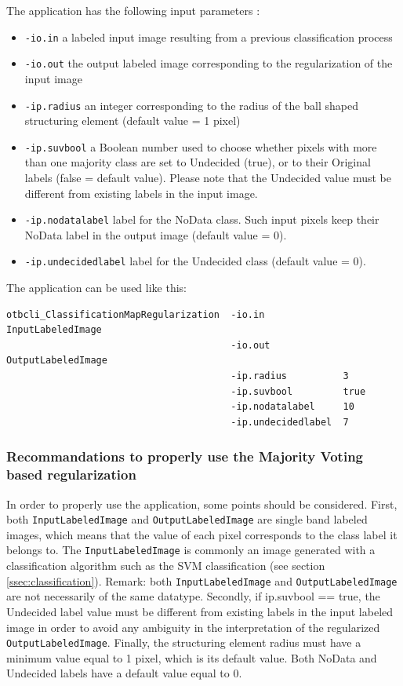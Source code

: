 The  application has the following input parameters :
\begin{itemize}
\item \verb?-io.in? a labeled input image resulting from a previous classification process
\item \verb?-io.out? the output labeled image corresponding to the regularization of the input image
\item \verb?-ip.radius? an integer corresponding to the radius of the ball shaped structuring element (default value = 1 pixel)
\item \verb?-ip.suvbool? a Boolean number used to choose whether pixels with more than one majority class are set to Undecided (true),
or to their Original labels (false = default value). Please note that the Undecided value must be different from existing labels in the input image.
\item \verb?-ip.nodatalabel? label for the NoData class. Such input pixels keep their NoData label in the output image (default value = 0).
\item \verb?-ip.undecidedlabel? label for the Undecided class (default value = 0).
\end{itemize}


The application can be used like this:
\begin{verbatim}
otbcli_ClassificationMapRegularization  -io.in              InputLabeledImage
                                        -io.out             OutputLabeledImage
                                        -ip.radius          3
                                        -ip.suvbool         true
                                        -ip.nodatalabel     10
                                        -ip.undecidedlabel  7
\end{verbatim}
 

\subsubsection{Recommandations to properly use the Majority Voting based regularization}

In order to properly use the  application, some points should be considered.
First, both \verb?InputLabeledImage? and \verb?OutputLabeledImage? are single band labeled images, which means that the
value of each pixel corresponds to the class label it belongs to. The \verb?InputLabeledImage? is commonly an image generated
with a classification algorithm such as the SVM classification (see section \ref{ssec:classification}). Remark: both
\verb?InputLabeledImage? and \verb?OutputLabeledImage? are not necessarily of the same datatype. Secondly, if ip.suvbool == true,
the Undecided label value must be different from existing labels in the input labeled image in order to avoid any ambiguity in the
interpretation of the regularized \verb?OutputLabeledImage?. Finally, the structuring element radius must have a minimum value equal to 1 pixel,
which is its default value. Both NoData and Undecided labels have a default value equal to 0.


